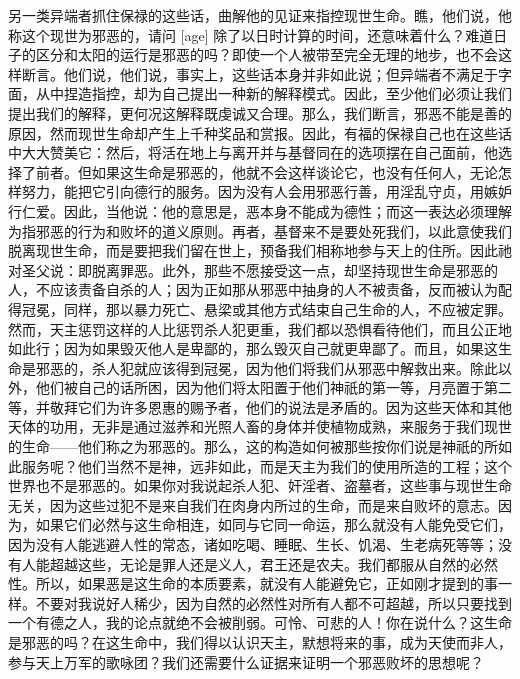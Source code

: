 另一类异端者抓住保禄的这些话，曲解他的见证来指控现世生命。瞧，他们说，他称这个现世为邪恶的，请问 [age] 除了以日时计算的时间，还意味着什么？难道日子的区分和太阳的运行是邪恶的吗？即使一个人被带至完全无理的地步，也不会这样断言。他们说，他们说，事实上，这些话本身并非如此说；但异端者不满足于字面，从中捏造指控，却为自己提出一种新的解释模式。因此，至少他们必须让我们提出我们的解释，更何况这解释既虔诚又合理。那么，我们断言，邪恶不能是善的原因，然而现世生命却产生上千种奖品和赏报。因此，有福的保禄自己也在这些话中大大赞美它：然后，将活在地上与离开并与基督同在的选项摆在自己面前，他选择了前者。但如果这生命是邪恶的，他就不会这样谈论它，也没有任何人，无论怎样努力，能把它引向德行的服务。因为没有人会用邪恶行善，用淫乱守贞，用嫉妒行仁爱。因此，当他说：他的意思是，恶本身不能成为德性；而这一表达必须理解为指邪恶的行为和败坏的道义原则。再者，基督来不是要处死我们，以此意使我们脱离现世生命，而是要把我们留在世上，预备我们相称地参与天上的住所。因此祂对圣父说：即脱离罪恶。此外，那些不愿接受这一点，却坚持现世生命是邪恶的人，不应该责备自杀的人；因为正如那从邪恶中抽身的人不被责备，反而被认为配得冠冕，同样，那以暴力死亡、悬梁或其他方式结束自己生命的人，不应被定罪。然而，天主惩罚这样的人比惩罚杀人犯更重，我们都以恐惧看待他们，而且公正地如此行；因为如果毁灭他人是卑鄙的，那么毁灭自己就更卑鄙了。而且，如果这生命是邪恶的，杀人犯就应该得到冠冕，因为他们将我们从邪恶中解救出来。除此以外，他们被自己的话所困，因为他们将太阳置于他们神祇的第一等，月亮置于第二等，并敬拜它们为许多恩惠的赐予者，他们的说法是矛盾的。因为这些天体和其他天体的功用，无非是通过滋养和光照人畜的身体并使植物成熟，来服务于我们现世的生命——他们称之为邪恶的。那么，这的构造如何被那些按你们说是神祇的所如此服务呢？他们当然不是神，远非如此，而是天主为我们的使用所造的工程；这个世界也不是邪恶的。如果你对我说起杀人犯、奸淫者、盗墓者，这些事与现世生命无关，因为这些过犯不是来自我们在肉身内所过的生命，而是来自败坏的意志。因为，如果它们必然与这生命相连，如同与它同一命运，那么就没有人能免受它们，因为没有人能逃避人性的常态，诸如吃喝、睡眠、生长、饥渴、生老病死等等；没有人能超越这些，无论是罪人还是义人，君王还是农夫。我们都服从自然的必然性。所以，如果恶是这生命的本质要素，就没有人能避免它，正如刚才提到的事一样。不要对我说好人稀少，因为自然的必然性对所有人都不可超越，所以只要找到一个有德之人，我的论点就绝不会被削弱。可怜、可悲的人！你在说什么？这生命是邪恶的吗？在这生命中，我们得以认识天主，默想将来的事，成为天使而非人，参与天上万军的歌咏团？我们还需要什么证据来证明一个邪恶败坏的思想呢？\par

